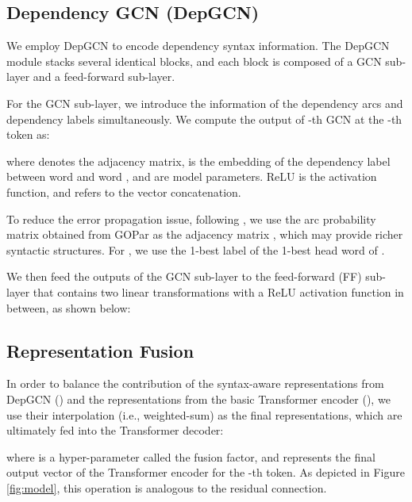 \documentclass[11pt]{article}
\begin{document}
\subsection{Dependency GCN (DepGCN)}
We employ DepGCN \cite{DBLP:conf/acl/ZhangLZ20} to encode dependency syntax information.
The DepGCN module stacks several identical blocks, and each block is composed of a GCN sub-layer and a feed-forward sub-layer. 



For the GCN sub-layer, we introduce the information of the dependency arcs and dependency labels simultaneously. We compute the output  of -th GCN at the -th token as:

where  denotes the adjacency matrix, 
 is the embedding of the dependency label between word  and word ,  and  are model parameters. ReLU \citep{nair2010rectified} is the activation function, and  refers to the vector concatenation. 

To reduce the error propagation issue, following \citet{DBLP:conf/acl/ZhangZWLZ20}, we use the arc probability matrix obtained from GOPar as the adjacency matrix , which may provide richer  syntactic structures. For , we use the 1-best label of the 1-best head word  of . 


We then feed the outputs of the GCN sub-layer to the feed-forward (FF) sub-layer that contains two linear transformations with a ReLU activation function in between, as shown below:





\subsection{Representation Fusion} 

In order to balance the contribution of the syntax-aware representations from DepGCN () and the representations from the basic Transformer encoder (), we use their interpolation (i.e., weighted-sum) as the final representations, which are ultimately fed into the Transformer decoder:

where  is a hyper-parameter called the fusion factor, and  represents the final output vector of the Transformer encoder for the -th token. 
As depicted in Figure \ref{fig:model}, 
this operation is analogous to the residual connection.  
\end{document}

